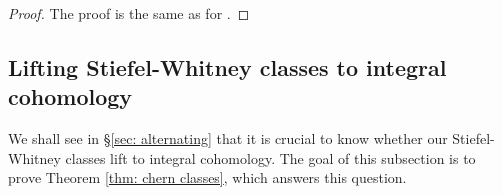 \documentclass[10pt, reqno]{amsart}
\numberwithin{equation}{subsection}
\newcommand{\Cal}[1]{\mathcal{#1}}
\newcommand{\A}{\mathbf{A}}
\theoremstyle{remark}
\begin{document}
\begin{proof}
The proof is the same as for \cite[Lemma 2.7]{Urabe96}. 


\begin{comment}
 but we reproduce the argument for the convenience of the reader. Choose a trivializing open cover $U_i$ on $X$ for $E$. The extension structure means that the transition functions for $E$ are upper ``block-triangular''
\[
\tau(E)_{ij} = \begin{pmatrix} \tau(E')_{ij} & u_{ij} \\ & \tau(E'')_{ij} \end{pmatrix}
\]
where $\tau(E')_{ij}$ are the transition functions for $E'$, and $\tau(E'')_{ij}$ are those for $E''$. Form the vector bundle $\Cal{E}$ over $X \times \A^1$ by gluing the trivial bundles over the open cover $U_i \times \A^1$ by the transition functions 
\[
\tau(E)_{ij} = \begin{pmatrix} \tau(E')_{ij} & tu_{ij} \\ & \tau(E'')_{ij} \end{pmatrix}
\]
where $t$ is the coordinate on $\A^1$. 


Let $s_0 \colon X \rightarrow X \times \A^1$ be the embedding $x \mapsto (x,0)$ and $s_1 \colon X \rightarrow X \times\A^1$ be the embedding $x \mapsto (x,1)$. Then $s_1^* \Cal{E} \cong E$, while $s_0^* \Cal{E} \cong E' \oplus E''$. By naturality of Stiefel-Whitney classes, we have $w(E) = s_1^* w(\Cal{E})$ and $w(E' \oplus E'') = s_0^* w(\Cal{E})$. But $s_0^*$ and $s_1^*$ are both inverse to the isomorphism on cohomology induced by the projection $X \times \A^1 \rightarrow X$, so they coincide. The result then follows from the split case. 
\end{comment}
\end{proof}






\subsection{Lifting Stiefel-Whitney classes to integral cohomology} 

We shall see in \S \ref{sec: alternating} that it is crucial to know whether our Stiefel-Whitney classes lift to integral cohomology. The goal of this subsection  is to prove Theorem \ref{thm: chern classes}, which answers this question. 
\end{document}
